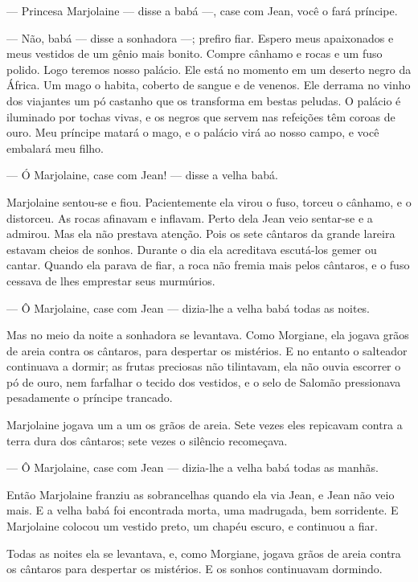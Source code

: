 --- Princesa Marjolaine --- disse a babá ---, case com Jean, você o fará
príncipe.

--- Não, babá --- disse a sonhadora ---; prefiro fiar. Espero meus apaixonados
e meus vestidos de um gênio mais bonito. Compre cânhamo e rocas e um fuso
polido. Logo teremos nosso palácio. Ele está no momento em um deserto
negro da África. Um mago o habita, coberto de sangue e de venenos. Ele
derrama no vinho dos viajantes um pó castanho que os transforma em bestas
peludas. O palácio é iluminado por tochas vivas, e os negros que servem
nas refeições têm coroas de ouro. Meu príncipe matará o mago, e o palácio
virá ao nosso campo, e você embalará meu filho.

--- Ó Marjolaine, case com Jean! --- disse a velha babá.

Marjolaine sentou-se e fiou. Pacientemente ela virou o fuso, torceu o
cânhamo, e o distorceu. As rocas afinavam e inflavam. Perto dela Jean
veio sentar-se e a admirou. Mas ela não prestava atenção. Pois os sete
cântaros da grande lareira estavam cheios de sonhos. Durante o dia ela
acreditava escutá-los gemer ou cantar. Quando ela parava de fiar, a roca
não fremia mais pelos cântaros, e o fuso cessava de lhes emprestar seus
murmúrios.

--- Ô Marjolaine, case com Jean --- dizia-lhe a velha babá todas as noites.

Mas no meio da noite a sonhadora se levantava. Como Morgiane, ela
jogava grãos de areia contra os cântaros, para despertar os mistérios. E
no entanto o salteador continuava a dormir; as frutas preciosas não
tilintavam, ela não ouvia escorrer o pó de ouro, nem farfalhar o tecido
dos vestidos, e o selo de Salomão pressionava pesadamente o príncipe
trancado.

Marjolaine jogava um a um os grãos de areia. Sete vezes eles repicavam
contra a terra dura dos cântaros; sete vezes o silêncio recomeçava.

--- Ô Marjolaine, case com Jean --- dizia-lhe a velha babá todas as
manhãs.

Então Marjolaine franziu as sobrancelhas quando ela via Jean, e Jean
não veio mais. E a velha babá foi encontrada morta, uma madrugada, bem
sorridente. E Marjolaine colocou um vestido preto, um chapéu escuro, e
continuou a fiar.

Todas as noites ela se levantava, e, como Morgiane, jogava grãos de
areia contra os cântaros para despertar os mistérios. E os sonhos continuavam dormindo.

